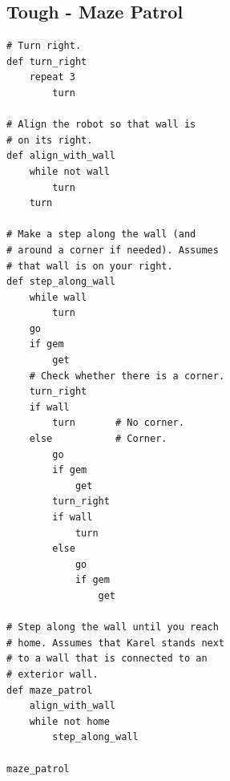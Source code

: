 \documentclass[article,A4,12pt]{llncs}
\begin{document}
\subsection{Tough - Maze Patrol}
\begin{verbatim}
# Turn right.
def turn_right
    repeat 3 
        turn

# Align the robot so that wall is 
# on its right.
def align_with_wall
    while not wall 
        turn
    turn

# Make a step along the wall (and 
# around a corner if needed). Assumes 
# that wall is on your right. 
def step_along_wall
    while wall 
        turn
    go
    if gem 
        get
    # Check whether there is a corner.
    turn_right
    if wall 
        turn       # No corner.   
    else           # Corner.
        go
        if gem 
            get
        turn_right
        if wall 
            turn
        else 
            go
            if gem 
                get

# Step along the wall until you reach 
# home. Assumes that Karel stands next 
# to a wall that is connected to an 
# exterior wall.
def maze_patrol
    align_with_wall
    while not home
        step_along_wall

maze_patrol
\end{verbatim}
\end{document}

